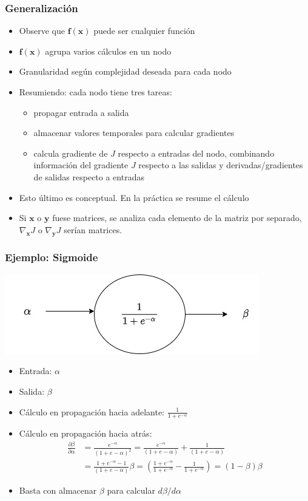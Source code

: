 \documentclass{beamer}
\begin{document}
\begin{frame}
\frametitle{Generalización}
\begin{itemize}
\item Observe que $\boldsymbol{f(x)}$ puede ser cualquier función
\item $\boldsymbol{f(x)}$ agrupa varios cálculos en un nodo 
\item Granularidad según complejidad deseada para cada nodo
\item Resumiendo: cada nodo tiene tres tareas:
\begin{itemize}
\item propagar entrada a salida 
\item almacenar valores temporales para calcular gradientes
\item calcula gradiente de $J$ respecto a entradas del nodo, combinando información del gradiente $J$ respecto a las salidas y derivadas/gradientes de salidas respecto a entradas
\end{itemize}
\item Esto último es conceptual. En la práctica se resume el cálculo 
\item Si $\boldsymbol{x}$ o $\boldsymbol{y}$ fuese matrices, se analiza cada elemento de la matriz por separado, $\nabla_{\boldsymbol{x}} J$ o $\nabla_{\boldsymbol{y}} J$ serían matrices.
\end{itemize}

\end{frame}
\begin{frame}
\frametitle{Ejemplo: Sigmoide}
\includegraphics[scale=0.4]{im19}
\begin{itemize}
\item Entrada: $\alpha$
\item Salida: $\beta$
\item Cálculo en propagación hacia adelante: $\frac{1}{1+e^{-\alpha}}$
\item Cálculo en propagación hacia atrás: 
\begin{equation*}
\begin{split}
\frac{\partial \beta}{\partial \alpha} &=\frac{e^{-\alpha}}{(1+e-{\alpha})^2}= \frac{e^{-\alpha}}{(1+e-{\alpha})}+\frac{1}{(1+e-{\alpha})}\\
&=\frac{1+e^{-\alpha}-1}{(1+e-{\alpha})} \beta = \left( \frac{1+e^{-\alpha}}{1+e^{-\alpha}}- \frac{1}{1+e^{-\alpha}}\right)= (1-\beta ) \beta
\end{split}
\end{equation*}
\item Basta con almacenar $\beta$ para calcular $d\beta/d\alpha$
\end{itemize}
\end{frame}
\end{document}

